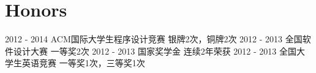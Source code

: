 \documentclass[letterpaper]{twentysecondcv} %
\begin{document}

\section{Honors}
\begin{twenty}
	\twentyitemthree
	{2012 - 2014}
	{ACM国际大学生程序设计竞赛}
	{银牌2次，铜牌2次}
	\twentyitemthree
	{2012 - 2013}
	{全国软件设计大赛}
	{一等奖2次}
	\twentyitemthree
	{2012 - 2013}
	{国家奖学金}
	{连续2年荣获}
	\twentyitemthree
	{2012 - 2013}
	{全国大学生英语竞赛}
	{一等奖1次，三等奖1次}
\end{twenty}
\end{document}
